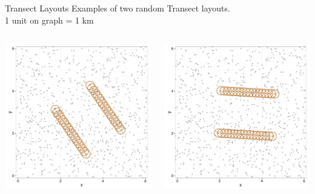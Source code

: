 \documentclass{beamer}
\begin{document}
\begin{frame}{Transect Layouts}
Examples of two random Transect layouts.\\
1 unit on graph = 1 km
	\begin{columns}
		\begin{column}{0.48\textwidth}
			\includegraphics[width=\textwidth]{../images/slides-layoutT2.pdf}
		\end{column}
		\begin{column}{0.48\textwidth}
			\includegraphics[width=\textwidth]{../images/slides-layoutT1.pdf}
		\end{column}
	\end{columns}


\end{frame}
\end{document}
